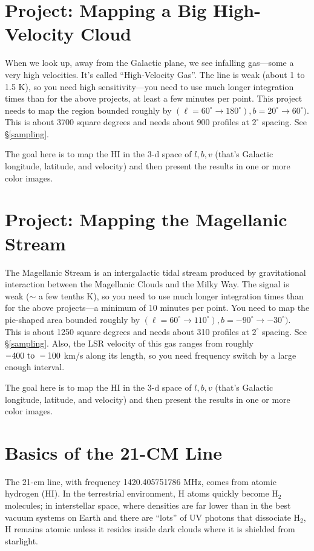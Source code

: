 \documentclass[psfig,preprint]{aastex}
\begin{document}
\section{Project: Mapping a Big High-Velocity Cloud}

\noindent
When we look up, away from the Galactic plane, we see infalling
gas---some a very high velocities. It's called ``High-Velocity Gas''.
The line is weak (about 1 to 1.5 K), so you need high sensitivity---you
need to use much longer integration times than for the above projects,
at least a few minutes per point.  This project needs to map the region
bounded roughly by $(\ell=60^\circ \rightarrow 180^\circ), b=20^\circ
\rightarrow 60^\circ)$. This is about 3700 square degrees and needs
about 900 profiles at $2^\circ$ spacing. See
\S \ref{sampling}.

The goal here is to map the HI in the 3-d space of ${l, b, v}$ (that's
Galactic longitude, latitude, and velocity) and then present the results
in one or more color images.

\section{Project: Mapping the Magellanic Stream}

\noindent
The Magellanic Stream is an intergalactic tidal stream produced by
gravitational interaction between the Magellanic Clouds and the Milky
Way. The signal is weak ($\sim$ a few tenths K), so you need to use much
longer integration times than for the above projects---a minimum of 10
minutes per point. You need to map the pie-shaped area bounded roughly
by $(\ell=60^\circ \rightarrow 110^\circ), b=-90^\circ \rightarrow
-30^\circ)$. This is about 1250 square degrees and needs about 310
profiles at $2^\circ$ spacing. See \S \ref{sampling}.  Also, the LSR
velocity of this gas ranges from roughly $-400 \ {\rm to} \ -100$ km/s
along its length, so you need frequency switch by a large enough
interval.

The goal here is to map the HI in the 3-d space of ${l, b, v}$ (that's
Galactic longitude, latitude, and velocity) and then present the results
in one or more color images.

\section{Basics of the 21-CM Line} \label{basics}

\noindent
	The 21-cm line, with frequency 1420.405751786 MHz, comes from
atomic hydrogen (HI).  In the terrestrial environment, H atoms quickly
become H$_2$ molecules; in interstellar space, where densities are far
lower than in the best vacuum systems on Earth and there are ``lots'' of
UV photons that dissociate H$_2$, H remains atomic unless it resides
inside dark clouds where it is shielded from starlight.
\end{document}
